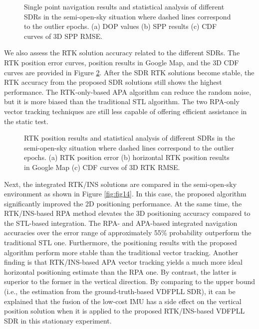 \documentclass{article}
\newcommand{\reffig}[1]{Figure \ref{#1}}
\begin{document}
\begin{figure}[htbp]%
\centering
{}%
\hfil
{}%
\hfil
{}%
\caption{Single point navigation results and statistical analysis of different SDRs in the semi-open-sky situation where dashed lines correspond to the outlier epochs. (a) DOP values (b) SPP results (c) CDF curves of 3D SPP RMSE. }%
\label{fig:fig12}%
\end{figure}


We also assess the RTK solution accuracy related to the different SDRs. The RTK position error curves, position results in Google Map, and the 3D CDF curves are provided in \reffig{fig:fig13}. After the SDR RTK solutions become stable, the RTK accuracy from the proposed SDR solutions still shows the highest performance. The RTK-only-based APA algorithm can reduce the random noise, but it is more biased than the traditional STL algorithm. The two RPA-only vector tracking techniques are still less capable of offering efficient assistance in the static test.  

\begin{figure}[htbp]%
\centering
{}%
\hfil
{}%
\hfil
{}%
\caption{RTK position results and statistical analysis of different SDRs in the semi-open-sky situation where dashed lines correspond to the outlier epochs. (a) RTK position error (b) horizontal RTK position results in Google Map (c) CDF curves of 3D RTK RMSE. }%
\label{fig:fig13}%
\end{figure}


Next, the integrated RTK/INS solutions are compared in the semi-open-sky environment as shown in \reffig{fig:fig14}. In this case, the proposed algorithm significantly improved the 2D positioning performance. At the same time, the RTK/INS-based RPA method elevates the 3D positioning accuracy compared to the STL-based integration. The RPA- and APA-based integrated navigation accuracies over the error range of approximately 55\% probability outperform the traditional STL one. Furthermore, the positioning results with the proposed algorithm perform more stable than the traditional vector tracking. Another finding is that RTK/INS-based APA vector tracking yields a much more ideal horizontal positioning estimate than the RPA one. By contrast, the latter is superior to the former in the vertical direction. By comparing to the upper bound (i.e., the estimation from the ground-truth-based VDFPLL SDR), it can be explained that the fusion of the low-cost IMU has a side effect on the vertical position solution when it is applied to the proposed RTK/INS-based VDFPLL SDR in this stationary experiment.
\end{document}
